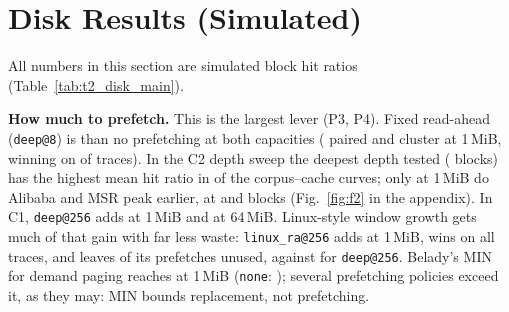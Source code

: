 
\section{Disk Results (Simulated)}\label{sec:disk}



All numbers in this section are simulated block hit ratios
(Table~\ref{tab:t2_disk_main}).

\textbf{How much to prefetch.} This is the largest lever (P3, P4). Fixed
read-ahead (\texttt{deep@8}) is \decDiskPThreeDeepAtEightAssumedOneMiBVerdict{}
than no prefetching at both capacities
(\decDiskPThreeDeepAtEightAssumedOneMiBPairedCI{} paired and
\decDiskPThreeDeepAtEightAssumedOneMiBClusterCI{} cluster at 1\,MiB, winning on
\diskDeltaHitRatioDeepAtEightVsNoneOneMiBWins{} of \diskDeltaHitRatioDeepAtEightVsNoneOneMiBN{}
traces). In the C2 depth sweep the deepest depth tested
(\diskCTwoDeepest{} blocks) has the highest mean hit ratio in
\diskCTwoBestIsDeepest{} of the \diskCTwoCurves{} corpus--cache curves; only at
1\,MiB do Alibaba and MSR peak earlier, at \diskCTwoBestDepthAlibabaOneMiB{} and
\diskCTwoBestDepthMsrOneMiB{} blocks (Fig.~\ref{fig:f2} in the appendix). In C1,
\texttt{deep@256} adds
\decDiskPThreeDeepAtTwoHundredFiftySixAssumedOneMiBPaired{} at 1\,MiB and
\decDiskPThreeDeepAtTwoHundredFiftySixAssumedSixtyFourMiBPaired{} at 64\,MiB.
Linux-style window growth gets much of that gain with far less waste:
\texttt{linux\_ra@256} adds \decDiskPFourLinuxRaAtTwoHundredFiftySixAssumedOneMiBPairedCI{}
at 1\,MiB, wins on all \diskDeltaHitRatioLinuxRaAtTwoHundredFiftySixVsNoneOneMiBN{}
traces, and leaves \diskWasteLinuxRaAtTwoHundredFiftySixOneMiB{} of its prefetches
unused, against \diskWasteDeepAtTwoHundredFiftySixOneMiB{} for \texttt{deep@256}.
Belady's MIN for demand paging reaches \diskHitBeladyMinOneMiB{} at 1\,MiB
(\texttt{none}: \diskHitNoneOneMiB); several prefetching policies exceed it,
as they may: MIN bounds replacement, not prefetching.

